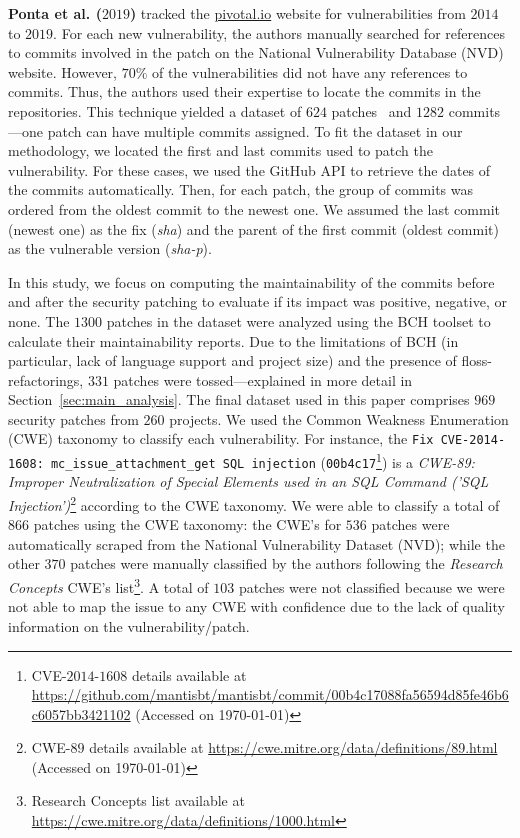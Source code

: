 \documentclass[smallextended]{svjour3}       %
\begin{document}
\textbf{Ponta et al. ($2019$)} tracked the \url{pivotal.io} website for 
vulnerabilities from $2014$ to $2019$. For each new vulnerability, 
the authors manually searched for references to commits involved in 
the patch on the National Vulnerability Database (NVD) website. 
However, $70\%$ of the vulnerabilities did not have any references 
to commits. Thus, the authors used their expertise to locate the 
commits in the repositories. This technique yielded a dataset of 
$624$ patches~\cite{10.1109/MSR.2019.00064} and $1282$ commits---one 
patch can have multiple commits assigned. To fit the dataset in our methodology, we located the 
first and last commits used to patch the vulnerability. For these 
cases, we used the GitHub API to retrieve the dates of 
the commits automatically. Then, for each patch, the group of commits was ordered 
from the oldest commit to the newest one. We assumed the last commit 
(newest one) as the fix (\emph{sha}) and the parent of the 
first commit (oldest commit) as the vulnerable version 
(\emph{sha-p}). 
%

In this study, we focus on computing the maintainability of the 
commits before and after the security patching to evaluate if its 
impact was positive, negative, or none. The $1300$ patches in the 
dataset were analyzed using the BCH toolset to calculate their 
maintainability reports. Due to the limitations of BCH (in particular, 
lack of language support and project size) and the presence of
floss-refactorings, $331$ patches were tossed---explained in 
more detail in Section~\ref{sec:main_analysis}.
The final dataset used in this 
paper comprises $969$ security patches from $260$ projects. We used the 
Common Weakness Enumeration (CWE) taxonomy to classify each vulnerability. 
For instance,  the \texttt{Fix CVE-2014-1608: mc\_issue\_attachment\_get SQL injection} 
(\texttt{00b4c17}\footnote{CVE-$2014$-$1608$ details available at 
\url{https://github.com/mantisbt/mantisbt/commit/00b4c17088fa56594d85fe46b6c6057bb3421102} 
(Accessed on \today)}) is a \emph{CWE-89: Improper Neutralization of Special Elements used 
in an SQL Command ('SQL Injection')}\footnote{CWE-$89$ details available at \url{https://cwe.mitre.org/data/definitions/89.html} 
(Accessed on \today)} according to the CWE taxonomy.
We were able to classify a total of $866$ patches using the CWE taxonomy:
the CWE's for $536$ patches were automatically scraped from the National 
Vulnerability Dataset (NVD); while the other $370$ patches were manually classified by 
the authors following the \emph{Research Concepts} CWE's list\footnote{Research Concepts list available at \url{https://cwe.mitre.org/data/definitions/1000.html}}. A total 
of $103$ patches were not classified because we were not able to map
the issue to any CWE with confidence due to the lack of quality
information on the vulnerability/patch.
\end{document}
